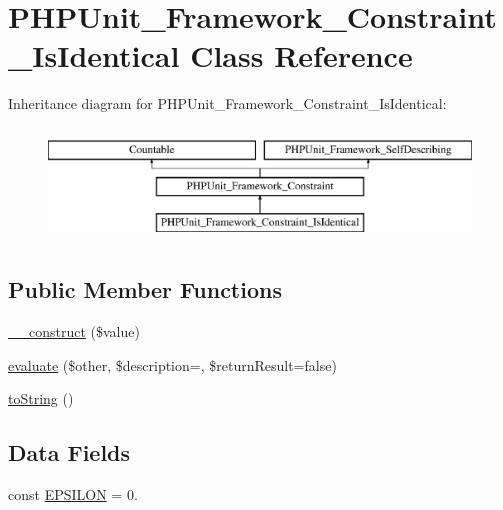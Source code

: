\hypertarget{class_p_h_p_unit___framework___constraint___is_identical}{}\section{P\+H\+P\+Unit\+\_\+\+Framework\+\_\+\+Constraint\+\_\+\+Is\+Identical Class Reference}
\label{class_p_h_p_unit___framework___constraint___is_identical}
Inheritance diagram for P\+H\+P\+Unit\+\_\+\+Framework\+\_\+\+Constraint\+\_\+\+Is\+Identical\+:\begin{figure}[H]
\begin{center}
\leavevmode
\includegraphics[height=3.000000cm]{class_p_h_p_unit___framework___constraint___is_identical}
\end{center}
\end{figure}
\subsection*{Public Member Functions}
\begin{DoxyCompactItemize}
\item 
\mbox{\hyperlink{class_p_h_p_unit___framework___constraint___is_identical_a7e17a19b592345a03763f050fffe0ce7}{\+\_\+\+\_\+construct}} (\$value)
\item 
\mbox{\hyperlink{class_p_h_p_unit___framework___constraint___is_identical_a4c184790087f7d42c3daf0d0180fe5fb}{evaluate}} (\$other, \$description=\textquotesingle{}\textquotesingle{}, \$return\+Result=false)
\item 
\mbox{\hyperlink{class_p_h_p_unit___framework___constraint___is_identical_a5558c5d549f41597377fa1ea8a1cefa3}{to\+String}} ()
\end{DoxyCompactItemize}
\subsection*{Data Fields}
\begin{DoxyCompactItemize}
\item 
const \mbox{\hyperlink{class_p_h_p_unit___framework___constraint___is_identical_a5593e0e1975e8ecac4f4b64ffe42d984}{E\+P\+S\+I\+L\+ON}} = 0.
\end{DoxyCompactItemize}
